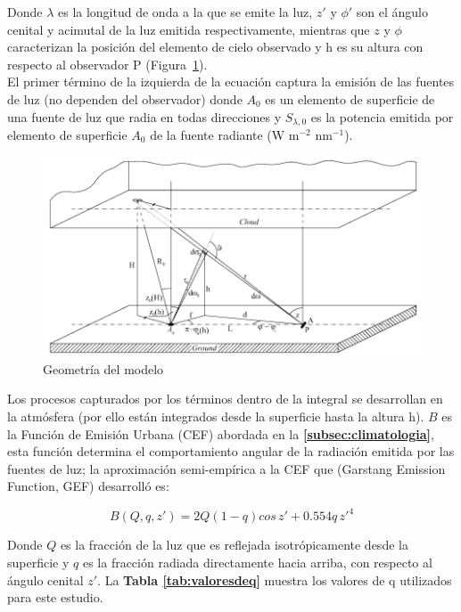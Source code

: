 Donde $\lambda$ es la longitud de onda a la que se emite la luz, $z'$ y $\phi'$ son el ángulo cenital y acimutal de la luz emitida respectivamente, mientras que $z$ y $\phi$ caracterizan la posición del elemento de cielo observado y h es su altura con respecto al observador P (Figura~\ref{geometriamodelo}).\\

El primer término de la izquierda de la ecuación captura la emisión de las fuentes de luz (no dependen del observador) donde $A_{0}$ es un elemento de superficie de una fuente de luz que radia en todas direcciones y $S_{\lambda, 0}$ es la potencia emitida por elemento de superficie $A_{0}$ de la fuente radiante (W m$^{-2}$ nm$^{-1}$).\\


\begin{figure}[htb]
  \centering
    \includegraphics[width=1\textwidth]{geometriamodelo}
  \caption{Geometría del modelo \citep{Kocifaj2007}}
  \label{geometriamodelo}
\end{figure}


Los procesos capturados por los términos dentro de la integral se desarrollan en la atmósfera (por ello están integrados desde la superficie hasta la altura h). $B$ es la Función de Emisión Urbana (CEF) abordada en la \textbf{\autoref{subsec:climatologia}}, esta función determina el comportamiento angular de la radiación emitida por las fuentes de luz; la aproximación semi-empírica a la CEF que \cite{Garstang1986} (Garstang Emission Function, GEF) desarrolló es:

\begin{equation}
B(Q, q, z') = 2Q(1-q) cos \, z' + 0.554q \,z'^{4}
\end{equation}

Donde $Q$ es la fracción de la luz que es reflejada isotrópicamente desde la superficie y $q$ es la fracción radiada directamente hacia arriba, con respecto al ángulo cenital $z'$. La \textbf{Tabla \ref{tab:valoresdeq}} muestra los valores de q utilizados para este estudio.


